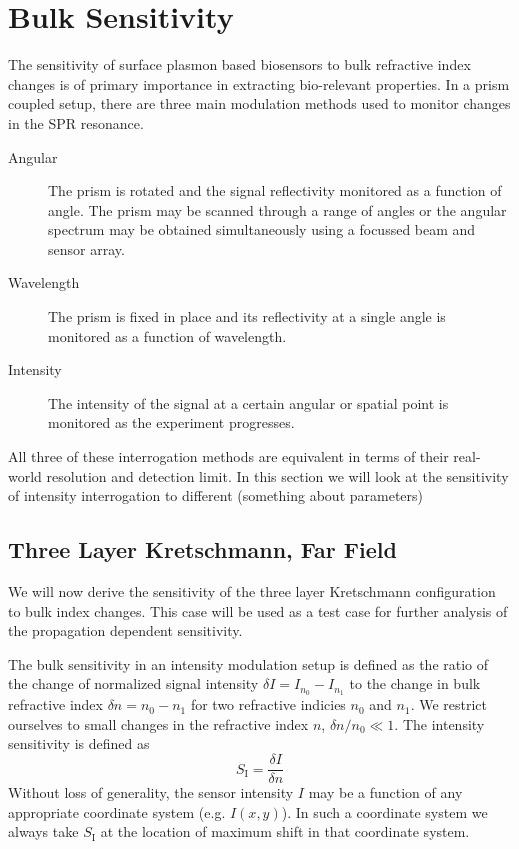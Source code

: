 \documentclass[a4paper,titlepage,onecolumn]{report}
\begin{document}
\chapter{Bulk Sensitivity}
The sensitivity of surface plasmon based biosensors to bulk refractive
index changes is of primary importance in extracting bio-relevant
properties. In a prism coupled setup, there are three main modulation
methods used to monitor changes in the SPR resonance.

\begin{description}
 \item [{Angular}] The prism is rotated and the signal reflectivity
  monitored
  as a function of angle. The prism may be scanned through a range of
  angles or the angular spectrum may be obtained simultaneously using
  a focussed beam and sensor array.
 \item [{Wavelength}] The prism is fixed in place and its reflectivity at
  a single angle is monitored as a function of wavelength.
 \item [{Intensity}] The intensity of the signal at a certain angular or
  spatial point is monitored as the experiment progresses.
\end{description}
All three of these interrogation methods are equivalent in terms of
their real-world resolution and detection limit. In this section we
will look at the sensitivity of intensity interrogation to different
(something about parameters)


\section{Three Layer Kretschmann, Far Field}
We will now derive the sensitivity of the three layer Kretschmann
configuration to bulk index changes. This case will be used as a test
case for further analysis of the propagation dependent sensitivity.

The bulk sensitivity in an intensity modulation setup is defined as
the ratio of the change of normalized signal intensity $\delta I=I_{n_{0}}-I_{n_{1}}$
to the change in bulk refractive index $\delta n=n_{0}-n_{1}$ for
two refractive indicies $n_{0}$ and $n_{1}$. We restrict ourselves
to small changes in the refractive index $n$, $\delta n/n_{0}\ll1$.
The intensity sensitivity is defined as
\begin{equation}
S_{\mathrm{I}}=\frac{\delta I}{\delta n}
\end{equation}
Without loss of generality, the sensor intensity $I$ may be a function
of any appropriate coordinate system (e.g. $I(x,y)$). In such a coordinate
system we always take $S_{\mathrm{I}}$ at the location of maximum
shift in that coordinate system.
\end{document}
